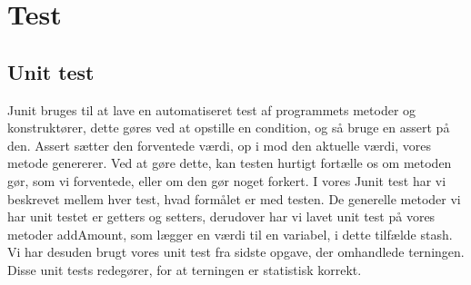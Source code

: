 \chapter{Test}

\section{Unit test}
Junit bruges til at lave en automatiseret test af programmets metoder og konstruktører, dette gøres ved at opstille en condition, og så bruge en assert på den. Assert sætter den forventede værdi, op i mod den aktuelle værdi, vores metode genererer. Ved at gøre dette, kan testen hurtigt fortælle os om metoden gør, som vi forventede, eller om den gør noget forkert. I vores Junit test har vi beskrevet mellem hver test, hvad formålet er med testen. De generelle metoder vi har unit testet er getters og setters, derudover har vi lavet unit test på vores metoder addAmount, som lægger en værdi til en variabel, i dette tilfælde stash. Vi har desuden brugt vores unit test fra sidste opgave, der omhandlede terningen. Disse unit tests redegører, for at terningen er statistisk korrekt.

